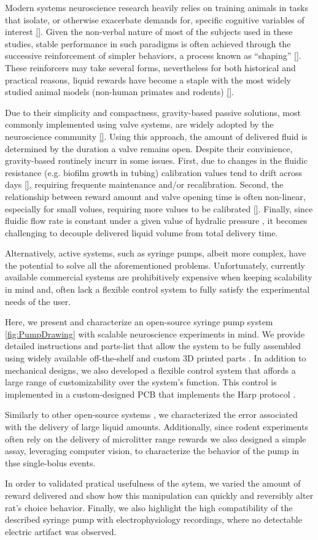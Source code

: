 
Modern systems neuroscience research heavily relies on training animals in tasks that isolate, or otherwise exacerbate demands for, specific cognitive variables of interest \ref{}. Given the non-verbal nature of most of the subjects used in these studies, stable performance in such paradigms is often achieved through the successive reinforcement of simpler behaviors, a process known as “shaping” \ref{}. These reinforcers may take several forms, nevertheless for both historical and practical reasons, liquid rewards have become a staple with the most widely studied animal models (non-human primates and rodents) \ref{}. 

Due to their simplicity and compactness, gravity-based passive solutions, most commonly implemented using valve systems, are widely adopted by the neuroscience community \ref{}. Using this approach, the amount of delivered fluid is determined by the duration a valve remains open. Despite their convinience, gravity-based routinely incurr in some issues. First, due to changes in the fluidic resistance (e.g. biofilm growth in tubing) calibration values tend to drift across days \ref{}, requiring frequente maintenance and/or recalibration. Second, the relationship between reward amount and valve opening time is often non-linear, especially for small volues, requiring more values to be calibrated \ref{}. Finally, since fluidic flow rate is constant under a given value of hydralic pressure \cite{}, it becomes challenging to decouple delivered liquid volume from total delivery time.

Alternatively, active systems, such as syringe pumps, albeit more complex, have the potential to solve all the aforementioned problems. Unfortunately, currently available commercial systems are prohibitively expensive when keeping scalability in mind and, often lack a flexible control system to fully satisfy the experimental needs of the user.

Here, we present and characterize an open-source syringe pump system \ref{fig:PumpDrawing} with scalable neuroscience experiments in mind. We provide detailed instructions and parts-list that allow the system to be fully assembled using widely available off-the-shelf and custom 3D printed parts . 
In addition to mechanical designs, we also developed a flexible control system that affords a large range of customizability over the system's function. This control is implemented in a custom-designed PCB that implements the Harp protocol  .

Similarly to other open-source systems \cite{}, we characterized the error associated with the delivery of large liquid amounts. Additionally, since rodent experiments often rely on the delivery of microlitter range rewards we also designed a simple assay, leveraging computer vision, to characterize the behavior of the pump in thse single-bolus events.

In order to validated pratical usefulness of the sytem, we varied the amount of reward delivered and show how this manipulation can quickly and reversibly alter rat's choice behavior. Finally, we also highlight the high compatibility of the described syringe pump with electrophysiology recordings, where no detectable electric artifact was observed.
